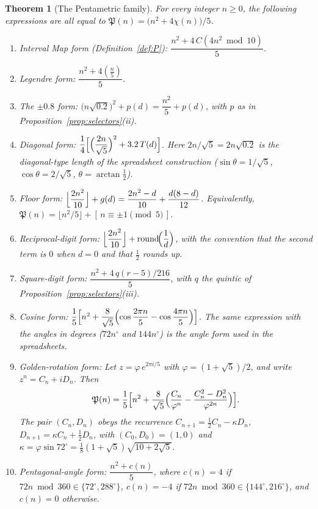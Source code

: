 \documentclass[11pt,a4paper]{article}
\newcommand{\Pent}{\mathfrak{P}}                      %
\newcommand{\leg}[1]{\left(\tfrac{#1}{5}\right)}      %
\theoremstyle{plain}
\newtheorem{theorem}{Theorem}[section]
\theoremstyle{definition}
\theoremstyle{remark}
\begin{document}
\begin{theorem}[The Pentametric family]\label{thm:family}
For every integer $n\ge0$, the following expressions are all equal to $\Pent(n)=\bigl(n^{2}+4\chi(n)\bigr)/5$.
\begin{enumerate}[label=\textbf{(F\arabic*)},leftmargin=3.2em,itemsep=4pt]
  \item \emph{Interval Map form (Definition~\ref{def:P}):} $\dfrac{n^{2}+4\,C(4n^{2}\bmod 10)}{5}$.
  \item \emph{Legendre form:} $\dfrac{n^{2}+4\leg{n}}{5}$.
  \item \emph{The $\pm0.8$ form:} $\bigl(n\sqrt{0.2}\bigr)^{2}+p(d)=\dfrac{n^{2}}{5}+p(d)$, with $p$ as in Proposition~\ref{prop:selectors}(ii).
  \item \emph{Diagonal form:} $\dfrac14\Bigl[\Bigl(\dfrac{2n}{\sqrt5}\Bigr)^{2}+3.2\,T(d)\Bigr]$. Here $2n/\sqrt5=2n\sqrt{0.2}$ is the diagonal-type length of the spreadsheet construction ($\sin\theta=1/\sqrt5$, $\cos\theta=2/\sqrt5$, $\theta=\arctan\frac12$).
  \item \emph{Floor form:} $\Bigl\lfloor\dfrac{2n^{2}}{10}\Bigr\rfloor+g(d)=\dfrac{2n^{2}-d}{10}+\dfrac{d(8-d)}{12}$. Equivalently, $\Pent(n)=\lfloor n^{2}/5\rfloor+[\,n\equiv\pm1\pmod5\,]$.
  \item \emph{Reciprocal-digit form:} $\Bigl\lfloor\dfrac{2n^{2}}{10}\Bigr\rfloor+\operatorname{round}\!\Bigl(\dfrac1d\Bigr)$, with the convention that the second term is $0$ when $d=0$ and that $\tfrac12$ rounds up.
  \item \emph{Square-digit form:} $\dfrac{n^{2}+4\,q(r-5)/216}{5}$, with $q$ the quintic of Proposition~\ref{prop:selectors}(iii).
  \item \emph{Cosine form:} $\dfrac15\Bigl[n^{2}+\dfrac{8}{\sqrt5}\Bigl(\cos\dfrac{2\pi n}{5}-\cos\dfrac{4\pi n}{5}\Bigr)\Bigr]$. The same expression with the angles in degrees ($72n^\circ$ and $144n^\circ$) is the angle form used in the spreadsheets.
  \item \emph{Golden-rotation form:} Let $z=\varphi\,e^{2\pi i/5}$ with $\varphi=(1+\sqrt5)/2$, and write $z^{n}=C_n+iD_n$. Then
  \[
    \Pent(n)=\frac15\Bigl[n^{2}+\frac{8}{\sqrt5}\Bigl(\frac{C_n}{\varphi^{n}}-\frac{C_n^{2}-D_n^{2}}{\varphi^{2n}}\Bigr)\Bigr].
  \]
  The pair $(C_n,D_n)$ obeys the recurrence $C_{n+1}=\tfrac12C_n-\kappa D_n$, $D_{n+1}=\kappa C_n+\tfrac12D_n$, with $(C_0,D_0)=(1,0)$ and $\kappa=\varphi\sin72^\circ=\tfrac18(1+\sqrt5)\sqrt{10+2\sqrt5}$.
  \item \emph{Pentagonal-angle form:} $\dfrac{n^{2}+c(n)}{5}$, where $c(n)=4$ if $72n\bmod360\in\{72^\circ,288^\circ\}$, $c(n)=-4$ if $72n\bmod360\in\{144^\circ,216^\circ\}$, and $c(n)=0$ otherwise.
\end{enumerate}
\end{theorem}
\end{document}
